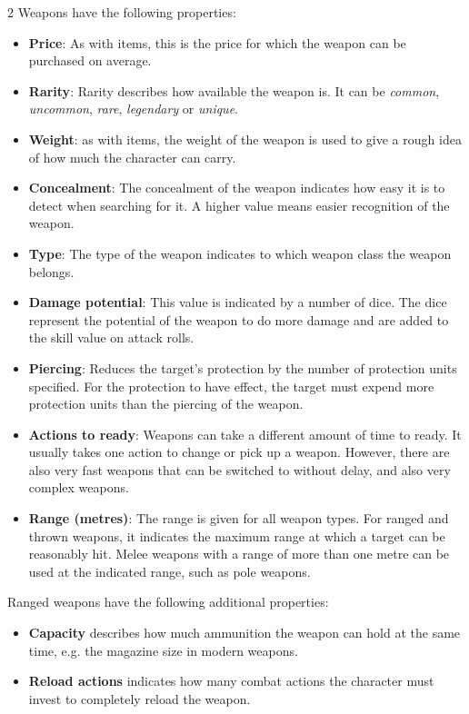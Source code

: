 \begin{multicols}{2}
Weapons have the following properties:
\begin{itemize}
    \item \textbf{Price}: As with items, this is the price for which the weapon can be purchased on average.
    \item \textbf{Rarity}: Rarity describes how available the weapon is. It can be \textit{common}, \textit{uncommon}, \textit{rare}, \textit{legendary} or \textit{unique}.
    \item \textbf{Weight}: as with items, the weight of the weapon is used to give a rough idea of how much the character can carry.
    \item \textbf{Concealment}: The concealment of the weapon indicates how easy it is to detect when searching for it. A higher value means easier recognition of the weapon.
    \item \textbf{Type}: The type of the weapon indicates to which weapon class the weapon belongs.
    \item \textbf{Damage potential}: This value is indicated by a number of dice. The dice represent the potential of the weapon to do more damage and are added to the skill value on attack rolls.
    \item \textbf{Piercing}: Reduces the target's protection by the number of protection units specified. For the protection to have effect, the target must expend more protection units than the piercing of the weapon.
    \item \textbf{Actions to ready}: Weapons can take a different amount of time to ready. It usually takes one action to change or pick up a weapon. However, there are also very fast weapons that can be switched to without delay, and also very complex weapons.
    \item \textbf{Range (metres)}: The range is given for all weapon types. For ranged and thrown weapons, it indicates the maximum range at which a target can be reasonably hit. Melee weapons with a range of more than one metre can be used at the indicated range, such as pole weapons.
\end{itemize}

Ranged weapons have the following additional properties:
\begin{itemize}
    \item \textbf{Capacity} describes how much ammunition the weapon can hold at the same time, e.g. the magazine size in modern weapons.
    \item \textbf{Reload actions} indicates how many combat actions the character must invest to completely reload the weapon.
\end{itemize}


\end{multicols}
